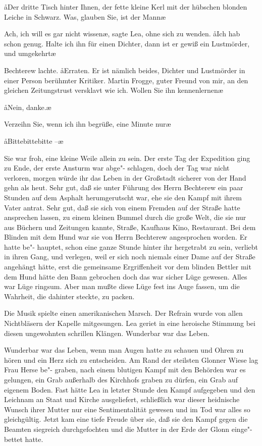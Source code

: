 \aa{}Der dritte Tisch hinter Ihnen, der fette kleine Kerl mit der
hübschen blonden Leiche in Schwarz. Was, glauben Sie, ist
der Mann\frag{}\ae{}

\aanah{}Ach, ich will es gar nicht wissen\ae{}, sagte Lea, ohne sich zu
wenden. \aa{}Ich hab schon genug. Halte ich ihn für einen Dichter,
dann ist er gewiß ein Lustmörder, und umgekehrt\ausr{}\ae{}

Bechterew lachte. \aa{}Erraten. Er ist nämlich beides, Dichter
und Lustmörder in einer Person\dopp{} berühmter Kritiker. Martin
Frogge, guter Freund von mir, an den gleichen Zeitungstrust
versklavt wie ich. Wollen Sie ihn kennenlernen\frag{}\ae{}

\aa{}Nein, danke.\ae{}

\aanah{}Verzeihn Sie, wenn ich ihn begrüße, eine Minute nur\frag{}\ae{}

\aa{}Bittebittebitte --\ae{}

Sie war froh, eine kleine Weile allein zu sein. Der erste Tag
der Expedition ging zu Ende, der erste Ansturm war abge"-%
schlagen, doch der Tag war nicht verloren, morgen würde ihr
das Leben in der Großstadt sicherer von der Hand gehn als
heut. Sehr gut, daß sie unter Führung des Herrn Bechterew
ein paar Stunden auf dem Asphalt herumgerutscht war, ehe
sie den Kampf mit ihrem Vater antrat. Sehr gut, daß sie sich
von einem Fremden auf der Straße hatte ansprechen lassen,
zu einem kleinen Bummel durch die große Welt, die sie nur
aus Büchern und Zeitungen kannte, Straße, Kaufhaus
Kino, Restaurant. Bei dem Blinden mit dem Hund war sie
von Herrn Bechterew angesprochen worden. Er hatte be"-%
hauptet, schon eine ganze Stunde hinter ihr hergetrabt zu
sein, verliebt in ihren Gang, und verlegen, weil er sich noch
niemals einer Dame auf der Straße angehängt hätte, erst die
gemeinsame Ergriffenheit vor dem blinden Bettler mit dem
Hund hätte den Bann gebrochen\dopp{} doch das war sicher Lüge
gewesen. Alles war Lüge ringsum. Aber man mußte diese
Lüge fest ins Auge fassen, um die Wahrheit, die dahinter steckte,
zu packen.

Die Musik spielte einen amerikanischen Marsch. Der Refrain
wurde von allen Nichtbläsern der Kapelle mitgesungen. Lea
geriet in eine heroische Stimmung bei diesen ungewohnten
schrillen Klängen. Wunderbar war das Leben.

Wunderbar war das Leben, wenn man Augen hatte zu
schauen und Ohren zu hören und ein Herz sich zu entscheiden.
Am Rand der steilsten Glonner Wiese lag Frau Herse be"-%
graben, nach einem blutigen Kampf mit den Behörden war
es gelungen, ein Grab außerhalb des Kirchhofs graben zu
dürfen, ein Grab auf eigenem Boden. Fast hätte Lea in letzter
Stunde den Kampf aufgegeben und den Leichnam an Staat
und Kirche ausgeliefert, schließlich war dieser heidnische
Wunsch ihrer Mutter nur eine Sentimentalität gewesen und
im Tod war alles so gleichgültig. Jetzt kam eine tiefe Freude
über sie, daß sie den Kampf gegen die Beamten siegreich
durchgefochten und die Mutter in der Erde der Glonn einge"-%
bettet hatte.

